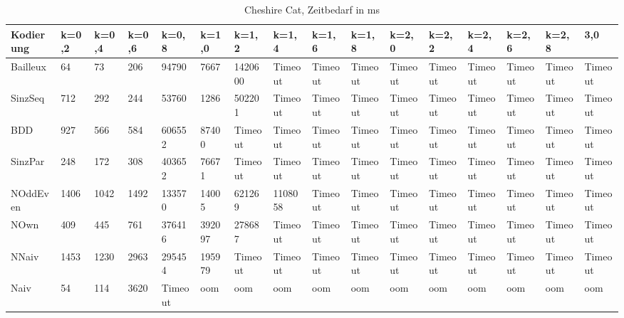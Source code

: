 \documentclass[a4,abstract=on]{scrartcl}
\begin{document}
\begin{landscape}
\begin{table}[h!]
   \end{table}

 \begin{table}[h!]
    \small
    \setlength{\tabcolsep}{0.11cm}
     \centering
     \begin{tabular}[width=\textwidth]{|l||l|l|l|l|l|l|l|l|l|l|l|l|l|l|l|}
	\hline
       \textbf{Kodierung}  & \textbf{k=0,2} & \textbf{k=0,4} & \textbf{k=0,6} &\textbf{k=0,8} &\textbf{k=1,0} &\textbf{k=1,2} &\textbf{k=1,4} &\textbf{k=1,6} &\textbf{k=1,8} &\textbf{k=2,0} &\textbf{k=2,2} &\textbf{k=2,4} &\textbf{k=2,6} &\textbf{k=2,8} & \textbf{3,0}\\
	\hline
	\hline
	Bailleux & 64 & 73 & 206 & 94790 & 7667 & 1420600 & Timeout & Timeout & Timeout & Timeout & Timeout & Timeout & Timeout & Timeout & Timeout\\
\hline
	SinzSeq & 712 & 292 & 244 & 53760 & 1286 & 502201 & Timeout & Timeout & Timeout & Timeout & Timeout & Timeout & Timeout & Timeout & Timeout \\
\hline
	BDD & 927 & 566 & 584 & 606552 & 87400 & Timeout & Timeout &Timeout &Timeout &Timeout & Timeout & Timeout & Timeout & Timeout & Timeout\\
\hline
	SinzPar & 248 & 172 & 308 & 403652 & 76671 & Timeout & Timeout & Timeout & Timeout & Timeout & Timeout & Timeout & Timeout & Timeout & Timeout \\
\hline
	NOddEven & 1406 & 1042 & 1492 & 133570 & 14005 & 621269 & 1108058 & Timeout & Timeout & Timeout& Timeout & Timeout & Timeout & Timeout & Timeout\\
\hline
	NOwn & 409 & 445 & 761 & 376416 & 392097 & 278687 & Timeout & Timeout & Timeout & Timeout & Timeout & Timeout &Timeout & Timeout & Timeout\\
 \hline
	NNaiv & 1453 & 1230 & 2963 & 295454 & 195979 & Timeout & Timeout & Timeout & Timeout & Timeout & Timeout & Timeout & Timeout & Timeout & Timeout\\
\hline
	Naiv & 54 & 114 &  3620 &  Timeout &  oom &  oom &  oom &  oom &  oom &  oom &  oom &  oom &  oom &  oom & oom\\
\hline
       
     \end{tabular}

     \caption{Cheshire Cat, Zeitbedarf in ms}
     \label{tbl:beispieltabelle}

   \end{table}


\end{landscape}
\end{document}
